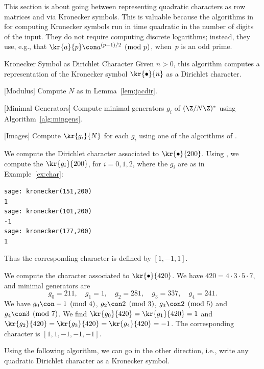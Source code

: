 This section is about going between representing quadratic
characters as row matrices and via Kronecker symbols.  This is
valuable because the algorithms in
\cite[\S1.1.4]{cohen:course_ant} for computing Kronecker symbols
run in time quadratic in the number of digits of the input.
They do
not require computing discrete logarithms; instead, 
they use, e.g., that
$\kr{a}{p} \con a^{(p-1)/2}\pmod{p}$, when~$p$ is an odd prime.

\begin{algorithm}{Kronecker Symbol as Dirichlet Character}\label{alg:jacobi}
  Given $n>0$, this algorithm computes a representation of
  the Kronecker symbol $\kr{\bullet}{n}$ as a Dirichlet character.
\begin{steps}
\item{}[Modulus] Compute $N$ as in Lemma~\ref{lem:jacdir}.
\item{}[Minimal Generators] Compute minimal generators $g_i$ of
  $(\Z/N\Z)^*$ using Algorithm~\ref{alg:mingens}.
\item{}[Images] Compute $\kr{g_i}{N}$ for each $g_i$ using one
of the algorithms of \cite[\S1.1.4]{cohen:course_ant}.
\end{steps}
\end{algorithm}

\begin{example}
We compute the Dirichlet character associated to $\kr{\bullet}{200}$.
Using \sage, we compute the $\kr{g_i}{200}$, for $i=0,1,2$, where the
$g_i$ are as in Example~\ref{ex:char}:
\begin{verbatim}
sage: kronecker(151,200)
1
sage: kronecker(101,200)
-1
sage: kronecker(177,200)
1
\end{verbatim}
Thus the corresponding character is defined by $[1,-1,1]$.
\end{example}




\begin{example}
We compute the character associated to $\kr{\bullet}{420}$.
We have $420=4\cdot 3\cdot 5\cdot 7$, and minimal generators
are 
$$
  g_0 = 211,\quad g_1=1, \quad g_2 = 281, \quad g_3=337, \quad g_4=241.
$$
We have $g_0\con -1\pmod{4}$, $g_2\con 2\pmod{3}$, $g_3\con 2\pmod{5}$
and $g_4\con 3\pmod{7}$.
We find $\kr{g_0}{420}=\kr{g_1}{420}=1$
and $\kr{g_2}{420}=\kr{g_3}{420}=\kr{g_4}{420}=-1$.
The corresponding character is $[1,1,-1,-1,-1]$.
\end{example}

Using the following algorithm, we can go in the other direction, i.e.,
write any quadratic Dirichlet character as a Kronecker symbol.

